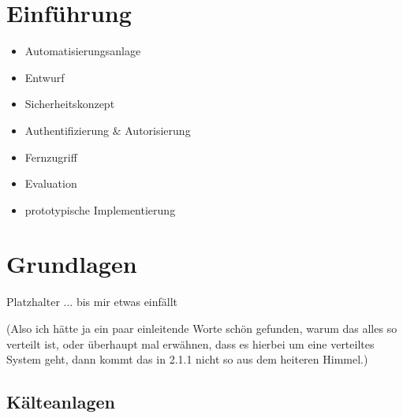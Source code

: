 \documentclass[11pt,a4paper]{report}
\begin{document}

\tableofcontents
\clearpage 


\chapter{Einführung} \label{chap:intro}

\begin{itemize}
\item Automatisierungsanlage
\item Entwurf 
\item Sicherheitskonzept
\item Authentifizierung \& Autorisierung
\item Fernzugriff
\item Evaluation
\item prototypische Implementierung
\end{itemize}

\chapter{Grundlagen} \label{chap:basics}

Platzhalter ... bis mir etwas einfällt

(Also ich hätte ja ein paar einleitende Worte schön gefunden, warum das alles so verteilt ist, oder überhaupt mal erwähnen, dass es hierbei um eine verteiltes System geht, dann kommt das in 2.1.1 nicht so aus dem heiteren Himmel.)

\section{Kälteanlagen}
\end{document}
